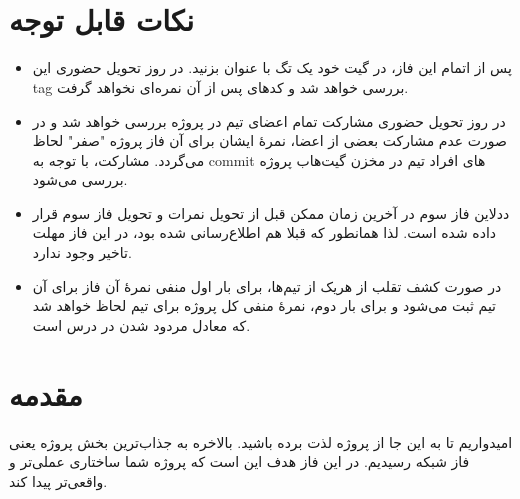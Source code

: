 \documentclass[]{article}
\begin{document}
\newpage
\pagestyle{fancy}
\fancyhf{}
\fancyfoot{}
\cfoot{\thepage}
\renewcommand{\headrulewidth}{2pt}

\KashidaOff


\tableofcontents

\newpage

 \Large \textbf{\\\\
}


\section*{{\titr نکات قابل توجه}}
\begin{itemize}
\item
پس از اتمام این فاز، در گیت خود یک تگ با عنوان  بزنید. در روز تحویل حضوری این tag بررسی خواهد شد و کدهای پس از آن نمره‌ای نخواهد گرفت.

\item
در روز تحویل حضوری مشارکت تمام اعضای تیم در پروژه بررسی خواهد‌ شد و در صورت عدم مشارکت بعضی از اعضا، نمرهٔ ایشان برای آن فاز پروژه "صفر" لحاظ می‌گردد. مشارکت، با توجه به commit های افراد تیم در مخزن گیت‌هاب پروژه بررسی می‌شود.

\item
ددلاین فاز سوم در آخرین زمان ممکن قبل از تحویل نمرات و تحویل فاز سوم قرار داده شده است. لذا همانطور که قبلا هم اطلاع‌رسانی شده بود، در این فاز مهلت تاخیر وجود ندارد.

\item
در صورت کشف تقلب از هریک از تیم‌ها، برای بار اول منفی نمرهٔ آن فاز برای آن تیم ثبت می‌شود و برای بار دوم، نمرهٔ منفی کل پروژه برای تیم لحاظ خواهد‌ شد که معادل مردود شدن در درس است.
\end{itemize}

\newpage

\section*{{\titr مقدمه}}
امیدواریم تا به این جا از پروژه لذت برده باشید. بالاخره به جذاب‌ترین بخش پروژه یعنی فاز شبکه رسیدیم. در این فاز هدف این است که پروژه شما ساختاری عملی‌تر و واقعی‌تر پیدا کند.
\end{document}
